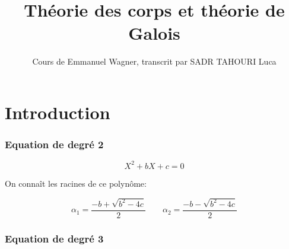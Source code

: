 \documentclass[]{report}
\title{Théorie des corps et théorie de Galois}
\author{Cours de Emmanuel Wagner, transcrit par SADR TAHOURI Luca}
\date{}
\begin{document}
    \maketitle
    \tableofcontents

    \chapter{Introduction}

    \subsection*{Equation de degré 2}

    \[X^2+bX+c=0\]
    \begin{center}
        On connaît les racines de ce polynôme:
    \end{center}
    \[\alpha_1=\frac{-b+\sqrt{b^2-4c}}{2}\qquad \alpha_2=\frac{-b-\sqrt{b^2-4c}}{2}\]

    \subsection*{Equation de degré 3}
\end{document}
